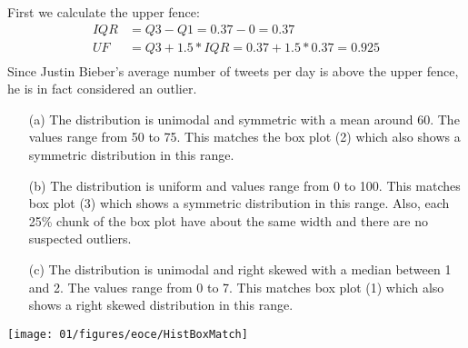 {
First we calculate the upper fence:
\begin{align*}
IQR &= Q3 - Q1 = 0.37 - 0 = 0.37 \\
UF &= Q3 + 1.5 * IQR = 0.37 + 1.5 * 0.37 = 0.925 \\
\end{align*}
Since Justin Bieber's average number of tweets per day is above the upper fence, he is in fact considered an outlier.
}

%

\noindent\begin{minipage}[c]{0.35\textwidth}
{
\begin{enumerate}
\item[(a)] The distribution is unimodal and symmetric with a mean around 60. The values range from 50 to 75. This matches the box plot (2) which also shows a symmetric distribution in this range.
\item[(b)] The distribution is uniform and values range from 0 to 100. This matches box plot (3) which shows a symmetric distribution in this range. Also, each 25\% chunk of the box plot have about the same width and there are no suspected outliers.
\item[(c)] The distribution is unimodal and right skewed with a median between 1 and 2. The values range from 0 to 7. This matches box plot (1) which also shows a right skewed distribution in this range.
\end{enumerate}
}
\end{minipage}
\begin{minipage}[c]{0.64\textwidth}
\begin{center}
\texttt{[image: 01/figures/eoce/HistBoxMatch]}
\end{center}
\end{minipage}
%

